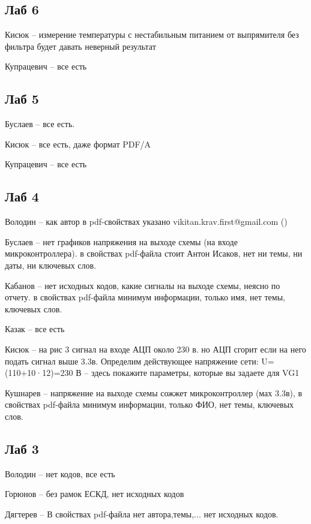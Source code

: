 \documentclass[a4paper,11pt]{article}
\begin{document}
\newpage
{}
\recalctypearea

\subsection*{Лаб 6}
Кисюк -- измерение температуры с нестабильным питанием от выпрямителя без фильтра будет давать неверный результат

Купрацевич -- все есть

\subsection*{Лаб 5}
Буслаев -- все есть.

Кисюк -- все есть, даже формат PDF/A

Купрацевич -- все есть
\subsection*{Лаб 4}

Володин --  как автор в pdf-свойствах указано vikitan.krav.first@gmail.com ()

Буслаев -- нет графиков напряжения на выходе схемы (на входе микроконтроллера). в свойствах pdf-файла стоит Антон Исаков,
нет ни темы, ни даты, ни ключевых слов.

Кабанов -- нет исходных кодов, какие сигналы на выходе схемы, неясно по отчету.  в свойствах pdf-файла минимум информации,
только имя, нет темы, ключевых слов.

Казак -- все есть

Кисюк -- на рис 3 сигнал на входе АЦП около 230 в. но АЦП сгорит если на него подать сигнал выше 3.3в.  Определим действующее напряжение сети:
U=(110+10·12)=230 В  -- здесь покажите параметры, которые вы задаете для VG1

Кушнарев -- напряжение на выходе схемы сожжет микроконтроллер (мах 3.3в), в свойствах pdf-файла минимум информации,
только ФИО, нет темы, ключевых слов.

\newpage
\subsection*{Лаб 3}

Володин -- нет кодов, все есть

Горюнов -- без рамок ЕСКД, нет исходных кодов

Дягтерев --  В свойствах pdf-файла нет автора,темы,... нет исходных кодов.
\end{document}
